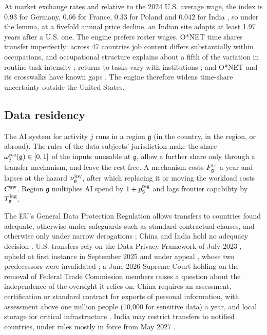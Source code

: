 At market exchange rates and relative to the 2024 U.S. average wage, the index is 0.93 for Germany, 0.66 for France, 0.33 for Poland and 0.042 for India \citep{oecd2025pensions}, so under the lemma, at a fivefold annual price decline, an Indian site adopts at least 1.97 years after a U.S. one. The engine prefers roster wages. O*NET time shares transfer imperfectly: across 47 countries job content differs substantially within occupations, and occupational structure explains about a fifth of the variation in routine task intensity \citep{lewandowski2022technology}; returns to tasks vary with institutions \citep{delarica2020job}; and O*NET and its crosswalks have known gaps \citep{handel2016onet,bls2012isco,pizzinelli2023labor}. The engine therefore widens time-share uncertainty outside the United States.

\subsection{Data residency}\label{sec:labor-residency}

\begin{assumption}\label{ass:labor-residency}
The AI system for activity $j$ runs in a region $\mathfrak g$ (in the country, in the region, or abroad). The rules of the data subjects' jurisdiction make the share $\omega^{\rm res}_j(\mathfrak g)\in[0,1]$ of the inputs unusable at $\mathfrak g$, allow a further share only through a transfer mechanism, and leave the rest free. A mechanism costs $F^{\rm tr}_{\mathfrak g}$ a year and lapses at the hazard $\nu^{\rm inv}_{\mathfrak g}$, after which replacing it or moving the workload costs $C^{\rm sw}$. Region $\mathfrak g$ multiplies AI spend by $1+p^{\rm reg}_{\mathfrak g}$ and lags frontier capability by $T^{\rm lag}_{\mathfrak g}$.
\end{assumption}

The EU's General Data Protection Regulation allows transfers to countries found adequate, otherwise under safeguards such as standard contractual clauses, and otherwise only under narrow derogations \citep{eu2016regulation,eu2021scc}; China and India hold no adequacy decision \citep{ec2026adequacy}. U.S. transfers rely on the Data Privacy Framework of July 2023 \citep{eu2023dpf}, upheld at first instance in September 2025 and under appeal \citep{eugc2025latombe}, whose two predecessors were invalidated \citep{cjeu2015schrems,cjeu2020schrems}; a June 2026 Supreme Court holding on the removal of Federal Trade Commission members \citep{us2026slaughter} raises a question about the independence of the oversight it relies on. China requires an assessment, certification or standard contract for exports of personal information, with assessment above one million people (10,000 for sensitive data) a year, and local storage for critical infrastructure \citep{cn2021pipl,cn2024flows,cn2025certification}. India may restrict transfers to notified countries, under rules mostly in force from May 2027 \citep{in2023dpdp,in2025dpdprules}.

